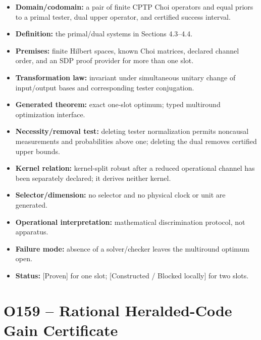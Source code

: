 \documentclass[11pt,a4paper,openany]{report}
\newcommand{\statusProven}{\textcolor{fingreen}{[Proven]}}
\begin{document}
\begin{itemize}
\item 
\textbf{Domain/\allowbreak{}codomain:} a pair of finite CPTP Choi operators and equal priors to a primal tester, dual upper operator, and certified success interval.

\item 
\textbf{Definition:} the primal/\allowbreak{}dual systems in Sections 4.3--4.4.

\item 
\textbf{Premises:} finite Hilbert spaces, known Choi matrices, declared channel order, and an SDP proof provider for more than one slot.

\item 
\textbf{Transformation law:} invariant under simultaneous unitary change of input/\allowbreak{}output bases and corresponding tester conjugation.

\item 
\textbf{Generated theorem:} exact one-slot optimum; typed multiround optimization interface.

\item 
\textbf{Necessity/\allowbreak{}removal test:} deleting tester normalization permits noncausal measurements and probabilities above one; deleting the dual removes certified upper bounds.

\item 
\textbf{Kernel relation:} kernel-split robust after a reduced operational channel has been separately declared; it derives neither kernel.

\item 
\textbf{Selector/\allowbreak{}dimension:} no selector and no physical clock or unit are generated.

\item 
\textbf{Operational interpretation:} mathematical discrimination protocol, not apparatus.

\item 
\textbf{Failure mode:} absence of a solver/\allowbreak{}checker leaves the multiround optimum open.

\item 
\textbf{Status:} \statusProven{} for one slot; [Constructed /\allowbreak{} Blocked locally] for two slots.

\end{itemize}

\section{O159 -- Rational Heralded-Code Gain Certificate}
\end{document}
